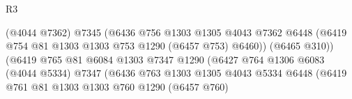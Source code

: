 \begin{lexlean}{R3}
\begin{coremodule}
                                              (@4044 @7362)
                                              @7345
                                              (@6436
                                                @756
                                                @1303
                                                @1305
                                                @4043
                                                @7362
                                                @6448
                                                (@6419
                                                  @754
                                                  @81
                                                  @1303
                                                  @1303
                                                  @753
                                                  @1290
                                                  (@6457 @753)
                                                  @6460))
                                              (@6465 @310))
                                            (@6419
                                              @765
                                              @81
                                              @6084
                                              @1303
                                              @7347
                                              @1290
                                              (@6427
                                                @764
                                                @1306
                                                @6083
                                                (@4044 @5334)
                                                @7347
                                                (@6436
                                                  @763
                                                  @1303
                                                  @1305
                                                  @4043
                                                  @5334
                                                  @6448
                                                  (@6419
                                                    @761
                                                    @81
                                                    @1303
                                                    @1303
                                                    @760
                                                    @1290
                                                    (@6457 @760)

\end{coremodule}
\end{lexlean}
